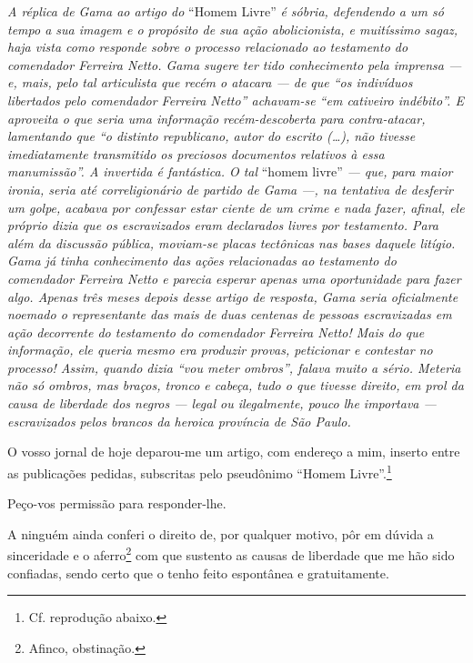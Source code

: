 \begin{didascalia}
\emph{A réplica de Gama ao artigo do} ``Homem Livre'' \emph{é sóbria,
defendendo a um só tempo a sua imagem e o propósito de sua ação
abolicionista, e muitíssimo sagaz, haja vista como responde sobre o
processo relacionado ao testamento do comendador Ferreira Netto. Gama
sugere ter tido conhecimento pela imprensa --- e, mais, pelo tal
articulista que recém o atacara --- de que ``os indivíduos libertados pelo
comendador Ferreira Netto'' achavam-se ``em cativeiro indébito''. E
aproveita o que seria uma informação recém-descoberta para
contra-atacar, lamentando que ``o distinto republicano, autor do escrito
(\ldots{}), não tivesse imediatamente transmitido os preciosos documentos
relativos à essa manumissão''. A invertida é fantástica. O tal} ``homem
livre'' \emph{--- que, para maior ironia, seria até correligionário de
partido de Gama ---, na tentativa de desferir um golpe, acabava por
confessar estar ciente de um crime e nada fazer, afinal, ele próprio
dizia que os escravizados eram declarados livres por testamento. Para
além da discussão pública, moviam-se placas tectônicas nas bases daquele
litígio. Gama já tinha conhecimento das ações relacionadas ao testamento
do comendador Ferreira Netto e parecia esperar apenas uma oportunidade
para fazer algo. Apenas três meses depois desse artigo de resposta, Gama
seria oficialmente noemado o representante das mais de duas centenas de
pessoas escravizadas em ação decorrente do testamento do comendador
Ferreira Netto! Mais do que informação, ele queria mesmo era produzir
provas, peticionar e contestar no processo! Assim, quando dizia ``vou
meter ombros'', falava muito a sério. Meteria não só ombros, mas braços,
tronco e cabeça, tudo o que tivesse direito, em prol da causa de
liberdade dos negros --- legal ou ilegalmente, pouco lhe importava ---
escravizados pelos brancos da heroica província de São Paulo.}
\end{didascalia}


O vosso jornal de hoje deparou-me um artigo, com endereço a mim, inserto
entre as publicações pedidas, subscritas pelo pseudônimo ``Homem Livre''.\footnote{ Cf. reprodução abaixo.}

Peço-vos permissão para responder-lhe.

A ninguém ainda conferi o direito de, por qualquer motivo, pôr em dúvida
a sinceridade e o aferro\footnote{ Afinco, obstinação.} com que
sustento as causas de liberdade que me hão sido confiadas, sendo certo
que o tenho feito espontânea e gratuitamente.

